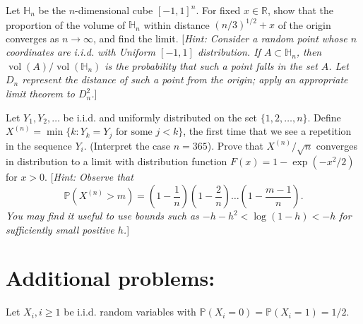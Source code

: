 \documentclass[answers]{exam}
\begin{document}
\begin{questions}



\question%
Let $\mathbb{H}_{n}$ be the $n$-dimensional cube $[-1,1]^{n}$. For fixed $x \in \mathbb{R}$, show that the proportion of the volume of $\mathbb{H}_{n}$ within distance $(n / 3)^{1 / 2}+x$ of the origin converges as $n \to \infty$, and find the limit. [\emph{Hint: Consider a random point whose $n$ coordinates are i.i.d. with Uniform $[-1,1]$ distribution. If $A \subset \mathbb{H}_{n}$, then $\operatorname{vol}(A) / \operatorname{vol}\left(\mathbb{H}_{n}\right)$ is the probability that such a point falls in the set $A$. Let $D_{n}$ represent the distance of such a point from the origin; apply an appropriate limit theorem to $D_{n}^{2}$.}]



\question%
Let $Y_{1}, Y_{2}, \ldots$ be i.i.d. and uniformly distributed on the set $\{1,2, \ldots, n\}$. Define $X^{(n)}=\min\{k: Y_{k}=Y_{j} \text{ for some } j<k\}$, the first time that we see a repetition in the sequence $Y_{i}$. (Interpret the case $n=365$). Prove that $X^{(n)} / \sqrt{n}$ converges in distribution to a limit with distribution function $F(x)=1-\exp(-x^{2} / 2)$ for $x>0$. [\emph{Hint: Observe that \[
	\mathbb{P}\left(X^{(n)}>m\right)=\left(1-\frac{1}{n}\right)\left(1-\frac{2}{n}\right) \ldots\left(1-\frac{m-1}{n}\right).
\] You may find it useful to use bounds such as $-h-h^{2}<\log (1-h)<-h$ for sufficiently small positive $h$.}]



\section*{Additional problems:}

\question%
Let $X_{i}, i \geq 1$ be i.i.d. random variables with $\mathbb{P}(X_{i}=0)=\mathbb{P}(X_{i}=1)=1 / 2$.
\end{questions}
\end{document}
